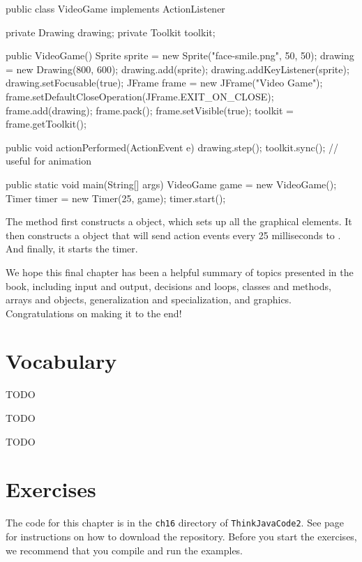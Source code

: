 \begin{code}
public class VideoGame implements ActionListener {
    private Drawing drawing;
    private Toolkit toolkit;

    public VideoGame() {
        Sprite sprite = new Sprite("face-smile.png", 50, 50);
        drawing = new Drawing(800, 600);
        drawing.add(sprite);
        drawing.addKeyListener(sprite);
        drawing.setFocusable(true);
        JFrame frame = new JFrame("Video Game");
        frame.setDefaultCloseOperation(JFrame.EXIT_ON_CLOSE);
        frame.add(drawing);
        frame.pack();
        frame.setVisible(true);
        toolkit = frame.getToolkit();
    }

    public void actionPerformed(ActionEvent e) {
        drawing.step();
        toolkit.sync();  // useful for animation
    }

    public static void main(String[] args) {
        VideoGame game = new VideoGame();
        Timer timer = new Timer(25, game);
        timer.start();
    }
}
\end{code}

The  method first constructs a  object, which sets up all the graphical elements.
It then constructs a  object that will send action events every 25 milliseconds to .
And finally, it starts the timer.

We hope this final chapter has been a helpful summary of topics presented in the book, including input and output, decisions and loops, classes and methods, arrays and objects, generalization and specialization, and graphics.
Congratulations on making it to the end!


\section{Vocabulary}

\begin{description}

TODO

TODO

TODO

\end{description}


\section{Exercises}

The code for this chapter is in the {\tt ch16} directory of {\tt ThinkJavaCode2}.
See page~\pageref{code} for instructions on how to download the repository.
Before you start the exercises, we recommend that you compile and run the examples.


